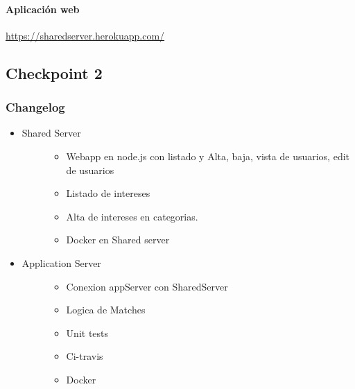 \documentclass[letterpaper,10pt,english]{sphinxmanual}
\begin{document}
\paragraph{Aplicación web}
\label{manuals:aplicacion-web}
\href{https://sharedserver.herokuapp.com/}{https://sharedserver.herokuapp.com/}


\subsection{Checkpoint 2}
\label{manuals:checkpoint-2}

\subsubsection{Changelog}
\label{manuals:id1}\begin{itemize}
\item {} \begin{description}
\item[{Shared Server}] \leavevmode\begin{itemize}
\item {} 
Webapp en node.js con listado y Alta, baja, vista de usuarios, edit de usuarios

\item {} 
Listado de intereses

\item {} 
Alta de intereses en categorias.

\item {} 
Docker en Shared server

\end{itemize}

\end{description}

\item {} \begin{description}
\item[{Application Server}] \leavevmode\begin{itemize}
\item {} 
Conexion appServer con SharedServer

\item {} 
Logica de Matches

\item {} 
Unit tests

\item {} 
Ci-travis

\item {} 
Docker

\end{itemize}


\end{description}
\end{itemize}
\end{document}
